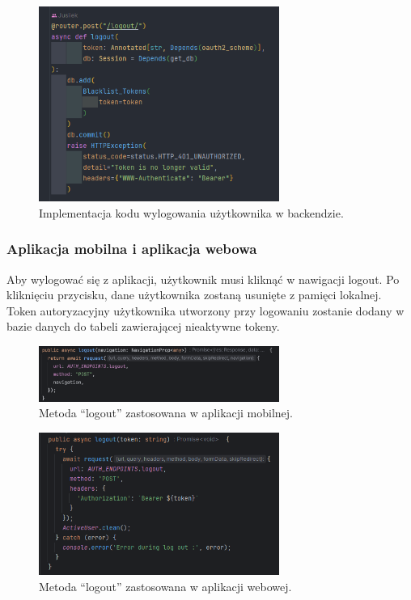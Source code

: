 \begin{figure}[H]
    \centering
    \includegraphics[width=0.7\textwidth]{chapters/chapter_8/screens/wylogowanie_backend}
    \caption{Implementacja kodu wylogowania użytkownika w backendzie.}
    \label{img:wylogowanie_backend}
\end{figure}

\subsubsection{Aplikacja mobilna i aplikacja webowa}
Aby wylogować się z aplikacji, użytkownik musi kliknąć w nawigacji logout. Po kliknięciu przycisku, dane użytkownika zostaną usunięte z pamięci lokalnej. Token autoryzacyjny użytkownika utworzony przy logowaniu zostanie dodany w bazie danych do tabeli zawierającej nieaktywne tokeny.

\begin{figure}[H]
    \centering
    \includegraphics[width=0.7\textwidth]{chapters/chapter_8/screens/wylogowanie_mobile}
    \caption{Metoda “logout” zastosowana w aplikacji mobilnej.}
    \label{img:wylogowanie_mobile}
\end{figure}

\begin{figure}[H]
    \centering
    \includegraphics[width=0.7\textwidth]{chapters/chapter_8/screens/wylogowanie_web}
    \caption{Metoda “logout” zastosowana w aplikacji webowej.}
    \label{img:wylogowanie_web}
\end{figure}


